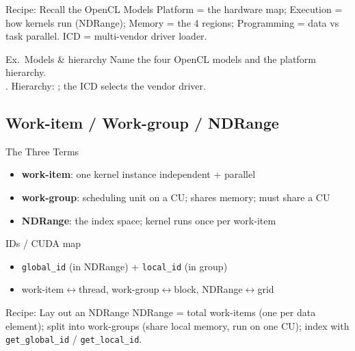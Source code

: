 \multend

\begin{KR}{Recipe: Recall the OpenCL Models}
    Platform = the hardware map; Execution = how kernels run (NDRange); Memory = the 4 regions; Programming = data vs task parallel. ICD = multi-vendor driver loader.
\end{KR}

\begin{example2}{Ex.\ Models \& hierarchy}
    Name the four OpenCL models and the platform hierarchy.
     \\ 
    . Hierarchy: ; the ICD selects the vendor driver.
\end{example2}

\subsection{Work-item / Work-group / NDRange}


\begin{definition}{The Three Terms}
    \begin{itemize}
        \item \textbf{work-item}: one kernel instance independent + parallel
        \item \textbf{work-group}: scheduling unit on a CU; shares memory; must share a CU
        \item \textbf{NDRange}: the index space; kernel runs once per work-item
    \end{itemize}
\end{definition}

\begin{concept}{IDs / CUDA map}
    \begin{itemize}
        \item \texttt{global\_id} (in NDRange) + \texttt{local\_id} (in group)
        \item work-item$\leftrightarrow$thread, work-group$\leftrightarrow$block, NDRange$\leftrightarrow$grid
    \end{itemize}
\end{concept}

\multend

\begin{KR}{Recipe: Lay out an NDRange}
    NDRange = total work-items (one per data element); split into work-groups (share local memory, run on one CU); index with \texttt{get\_global\_id} / \texttt{get\_local\_id}.
\end{KR}

